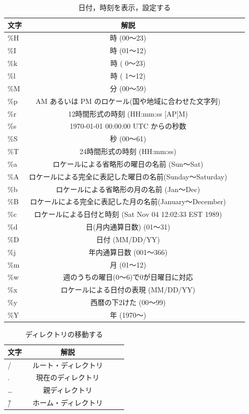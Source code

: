 \begin{table}[htb]
	\begin{center}
		 \caption{日付，時刻を表示，設定する}
 			\begin{tabular}{|l|c|r||r|} \hline
      文字 & 解説  \\ \hline \hline
\%H & 時 (00～23) \\ \hline
\%I & 時 (01～12) \\ \hline
\%k & 時 ( 0～23) \\ \hline
\%l & 時 ( 1～12) \\ \hline
\%M & 分 (00～59) \\ \hline
\%p & AM あるいは PM のロケール(国や地域に合わせた文字列) \\ \hline
\%r & 12時間形式の時刻 (HH:mm:ss [AP]M) \\ \hline
\%s & 1970-01-01 00:00:00 UTC からの秒数 \\ \hline
\%S & 秒 (00～61) \\ \hline
\%T & 24時間形式の時刻 (HH:mm:ss) \\ \hline
\%a & ロケールによる省略形の曜日の名前 (Sun～Sat) \\ \hline
\%A & ロケールによる完全に表記した曜日の名前(Sunday～Saturday) \\ \hline
\%b & ロケールによる省略形の月の名前 (Jan～Dec) \\ \hline
\%B & ロケールによる完全に表記した月の名前(January～December) \\ \hline
\%c & ロケールによる日付と時刻 (Sat Nov 04 12:02:33 EST 1989) \\ \hline
\%d & 日(月内通算日数) (01～31) \\ \hline
\%D & 日付 (MM/DD/YY) \\ \hline
\%j & 年内通算日数 (001～366) \\ \hline
\%m & 月 (01～12) \\ \hline
\%w & 週のうちの曜日(0～6)で0が日曜日に対応 \\ \hline
\%x & ロケールによる日付の表現 (MM/DD/YY) \\ \hline
\%y & 西暦の下2けた (00～99) \\ \hline
\%Y & 年 (1970～) \\ \hline
			\end{tabular}
	 \end{center}
\end{table}


\begin{table}[htb]
	\begin{center}
		 \caption{ディレクトリの移動する}
 			\begin{tabular}{|l|c|r||r|} \hline
      文字 & 解説  \\ \hline
   / & ルート・ディレクトリ　\\
    . & 現在のディレクトリ　\\
   … & 親ディレクトリ　\\
  \~/ & ホーム・ディレクトリ　\\ \hline
			\end{tabular}
	 \end{center}
\end{table}


